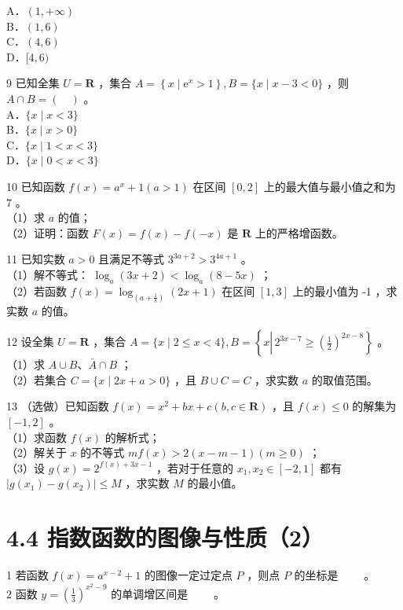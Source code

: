 \documentclass[10pt]{article}
\begin{document}
A．\((1,+\infty)\)\\
B．\((1,6)\)\\
C．\((4,6)\)\\
D．\([4,6)\)

9 已知全集 \(U=\mathbf{R}\) ，集合 \(A=\left\{x \mid \mathrm{e}^{x}>1\right\}, B=\{x \mid x-3<0\}\) ，则 \(A \cap B=(\quad)\) 。\\
A．\(\{x \mid x<3\}\)\\
B．\(\{x \mid x>0\}\)\\
C．\(\{x \mid 1<x<3\}\)\\
D．\(\{x \mid 0<x<3\}\)

10 已知函数 \(f(x)=a^{x}+1(a>1)\) 在区间 \([0,2]\) 上的最大值与最小值之和为 7 。\\
（1）求 \(a\) 的值；\\
（2）证明：函数 \(F(x)=f(x)-f(-x)\) 是 \(\mathbf{R}\) 上的严格增函数。

11 已知实数 \(a>0\) 且满足不等式 \(3^{3 a+2}>3^{4 a+1}\) 。\\
（1）解不等式： \(\log _{a}(3 x+2)<\log _{a}(8-5 x)\) ；\\
（2）若函数 \(f(x)=\log _{\left(a+\frac{1}{8}\right)}(2 x+1)\) 在区间 \([1,3]\) 上的最小值为 -1 ，求实数 \(a\) 的值。

12 设全集 \(U=\mathbf{R}\) ，集合 \(A=\{x \mid 2 \leqslant x<4\}, B=\left\{x \left\lvert\, 2^{3 x-7} \geqslant\left(\frac{1}{2}\right)^{2 x-8}\right.\right\}\) 。\\
（1）求 \(A \cup B 、 \bar{A} \cap B\) ；\\
（2）若集合 \(C=\{x \mid 2 x+a>0\}\) ，且 \(B \cup C=C\) ，求实数 \(a\) 的取值范围。

13 （选做）已知函数 \(f(x)=x^{2}+b x+c(b, c \in \mathbf{R})\) ，且 \(f(x) \leqslant 0\) 的解集为 \([-1,2]\) 。\\
（1）求函数 \(f(x)\) 的解析式；\\
（2）解关于 \(x\) 的不等式 \(m f(x)>2(x-m-1)(m \geqslant 0)\) ；\\
（3）设 \(g(x)=2^{f(x)+3 x-1}\) ，若对于任意的 \(x_{1}, x_{2} \in[-2,1]\) 都有 \(\left|g\left(x_{1}\right)-g\left(x_{2}\right)\right| \leqslant M\) ，求实数 \(M\) 的最小值。

\section*{4.4 指数函数的图像与性质（2）}
1 若函数 \(f(x)=a^{x-2}+1\) 的图像一定过定点 \(P\) ，则点 \(P\) 的坐标是 \(\qquad\)。\\
2 函数 \(y=\left(\frac{1}{3}\right)^{x^{2}-9}\) 的单调增区间是 \(\qquad\)。
\end{document}
